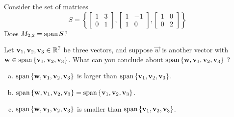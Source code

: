 \begin{applicationActivities}
\begin{activity}{5}
Consider the set of matrices
\[ S = \left\{
		\begin{bmatrix} 1 & 3 \\ 0 & 1 \end{bmatrix},
		\begin{bmatrix} 1 & -1 \\ 1 & 0 \end{bmatrix},
		\begin{bmatrix} 1 & 0 \\ 0 & 2 \end{bmatrix}
		\right\} \]
Does \(M_{2,2} = \operatorname{span} S\)?
\end{activity}

\begin{activity}{5}
Let \(\mathbf{v}_1, \mathbf{v}_2, \mathbf{v}_3 \in \mathbb{R}^7\) be three vectors, and suppose \(\vec{w}\) is another vector with \(\mathbf{w} \in \operatorname{span} \left\{ \mathbf{v}_1, \mathbf{v}_2, \mathbf{v}_3 \right\}\).  What can you conclude about \( \operatorname{span} \left\{ \mathbf{w}, \mathbf{v}_1, \mathbf{v}_2, \mathbf{v}_3 \right\} \) ?
\begin{enumerate}[(a)]
\item \( \operatorname{span} \left\{ \mathbf{w}, \mathbf{v}_1, \mathbf{v}_2, \mathbf{v}_3 \right\} \) is larger than \( \operatorname{span} \left\{ \mathbf{v}_1, \mathbf{v}_2, \mathbf{v}_3 \right\} \).
\item \( \operatorname{span} \left\{ \mathbf{w}, \mathbf{v}_1, \mathbf{v}_2, \mathbf{v}_3 \right\}  = \operatorname{span} \left\{ \mathbf{v}_1, \mathbf{v}_2, \mathbf{v}_3 \right\} \).
\item \( \operatorname{span} \left\{ \mathbf{w}, \mathbf{v}_1, \mathbf{v}_2, \mathbf{v}_3 \right\} \) is smaller than \( \operatorname{span} \left\{ \mathbf{v}_1, \mathbf{v}_2, \mathbf{v}_3 \right\} \).
\end{enumerate}
\end{activity}

\end{applicationActivities}
